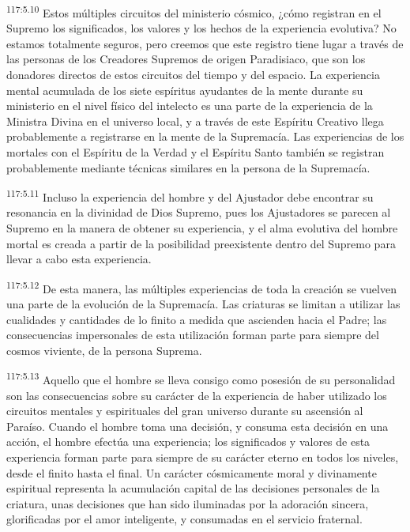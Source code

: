 \par
\textsuperscript{117:5.10} Estos múltiples circuitos del ministerio cósmico, ¿cómo registran en el Supremo los significados, los valores y los hechos de la experiencia evolutiva? No estamos totalmente seguros, pero creemos que este registro tiene lugar a través de las personas de los Creadores Supremos de origen Paradisiaco, que son los donadores directos de estos circuitos del tiempo y del espacio. La experiencia mental acumulada de los siete espíritus ayudantes de la mente durante su ministerio en el nivel físico del intelecto es una parte de la experiencia de la Ministra Divina en el universo local, y a través de este Espíritu Creativo llega probablemente a registrarse en la mente de la Supremacía. Las experiencias de los mortales con el Espíritu de la Verdad y el Espíritu Santo también se registran probablemente mediante técnicas similares en la persona de la Supremacía.

\par
\textsuperscript{117:5.11} Incluso la experiencia del hombre y del Ajustador debe encontrar su resonancia en la divinidad de Dios Supremo, pues los Ajustadores se parecen al Supremo en la manera de obtener su experiencia, y el alma evolutiva del hombre mortal es creada a partir de la posibilidad preexistente dentro del Supremo para llevar a cabo esta experiencia.

\par
\textsuperscript{117:5.12} De esta manera, las múltiples experiencias de toda la creación se vuelven una parte de la evolución de la Supremacía. Las criaturas se limitan a utilizar las cualidades y cantidades de lo finito a medida que ascienden hacia el Padre; las consecuencias impersonales de esta utilización forman parte para siempre del cosmos viviente, de la persona Suprema.

\par
\textsuperscript{117:5.13} Aquello que el hombre se lleva consigo como posesión de su personalidad son las consecuencias sobre su carácter de la experiencia de haber utilizado los circuitos mentales y espirituales del gran universo durante su ascensión al Paraíso. Cuando el hombre toma una decisión, y consuma esta decisión en una acción, el hombre efectúa una experiencia; los significados y valores de esta experiencia forman parte para siempre de su carácter eterno en todos los niveles, desde el finito hasta el final. Un carácter cósmicamente moral y divinamente espiritual representa la acumulación capital de las decisiones personales de la criatura, unas decisiones que han sido iluminadas por la adoración sincera, glorificadas por el amor inteligente, y consumadas en el servicio fraternal.

